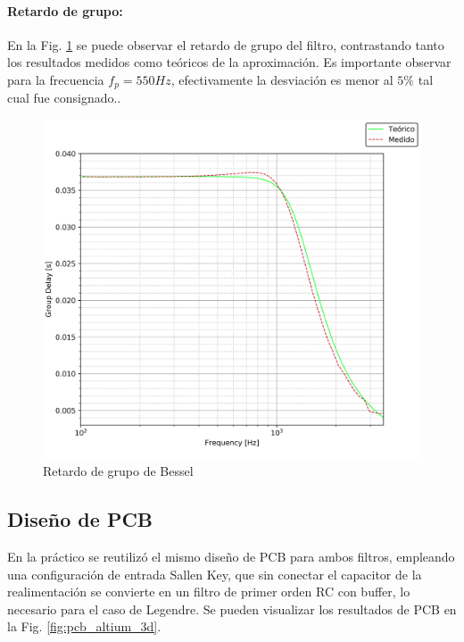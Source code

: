 \paragraph{Retardo de grupo:} En la Fig. \ref{fig:bessel_group_delay} se puede observar el retardo de grupo del filtro, contrastando tanto los resultados medidos como te\'oricos de la aproximaci\'on.
Es importante observar para la frecuencia $f_p = 550Hz$, efectivamente la desviaci\'on es menor al $5\%$ tal cual fue consignado..

\begin{figure}[H]
	\centering
	\includegraphics[scale=0.7]{../EJ1/Recursos/bessel_group_delay.png}
	\caption{Retardo de grupo de Bessel}
	\label{fig:bessel_group_delay}
\end{figure}

\subsection{Dise\~no de PCB}
En la pr\'actico se reutiliz\'o el mismo dise\~no de PCB para ambos filtros, empleando una configuraci\'on de entrada Sallen Key,
que sin conectar el capacitor de la realimentaci\'on se convierte en un filtro de primer orden RC con buffer, lo necesario para el caso
de Legendre. Se pueden visualizar los resultados de PCB en la Fig. \ref{fig:pcb_altium_3d}.

